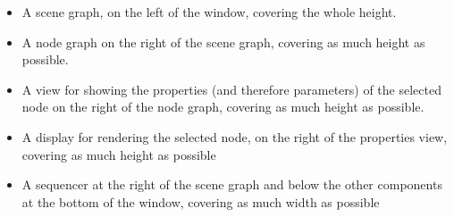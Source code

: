 \documentclass[%
    a4paper,    %
    justified,  %
    nobib,      %
    openany     %
]{tufte-book}
\begin{document}
\begin{itemize}
\item{%
    A scene graph, on the left of the window, covering the whole height.}
\item{%
    A node graph on the right of the scene graph, covering as much height as
    possible.}
\item{%
    A view for showing the properties (and therefore parameters) of the selected
    node on the right of the node graph, covering as much height as possible.}
\item{%
    A display for rendering the selected node, on the right of the properties
    view, covering as much height as possible}
\item{%
    A sequencer at the right of the scene graph and below the other components
    at the bottom of the window, covering as much width as possible}
\end{itemize}

\end{document}
